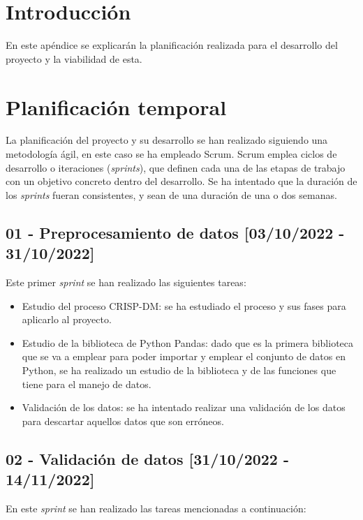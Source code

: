 
\section{Introducción}

En este apéndice se explicarán la planificación realizada para el desarrollo del proyecto y la viabilidad de esta.

\section{Planificación temporal}

La planificación del proyecto y su desarrollo se han realizado siguiendo una metodología ágil, en este caso se ha empleado Scrum. Scrum emplea ciclos de desarrollo o iteraciones (\textit{sprints}), que definen cada una de las etapas de trabajo con un objetivo concreto dentro del desarrollo. Se ha intentado que la duración de los \textit{sprints} fueran consistentes, y sean de una duración de una o dos semanas.

\subsection{01 - Preprocesamiento de datos [03/10/2022 - 31/10/2022]}

Este primer \textit{sprint} se han realizado las siguientes tareas:

\begin{itemize}
    \item Estudio del proceso CRISP-DM: se ha estudiado el proceso y sus fases para aplicarlo al proyecto.
    \item Estudio de la biblioteca de Python Pandas: dado que es la primera biblioteca que se va a emplear para poder importar y emplear el conjunto de datos en Python, se ha realizado un estudio de la biblioteca y de las funciones que tiene para el manejo de datos.
    \item Validación de los datos: se ha intentado realizar una validación de los datos para descartar aquellos datos que son erróneos.
\end{itemize}

\subsection{02 - Validación de datos [31/10/2022 - 14/11/2022]}

En este \textit{sprint} se han realizado las tareas mencionadas a continuación:

